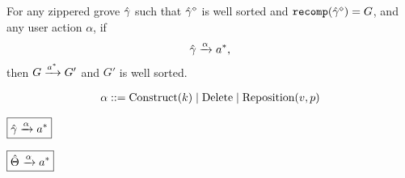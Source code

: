 \begin{theorem}[Sensibility]
  For any zippered grove $\Z{\Grove}$
  such that $\erase{\Z{\Grove}}$ is well sorted
    and $\recomp{\erase{\Z{\Grove}}} = G$,
  and any user action $\alpha$,
  if
  \[
    \applyAction{\Z{\Grove}}{\alpha}{a^{*}},
  \]
  then $G \action{a^{*}} G'$ and $G'$ is well sorted.
\end{theorem}

\[
  \arraycolsep=0pt
  \begin{array}{llll}
    \alpha & {}::={} &
      \Construct{k}
      \mid \Delete
      \mid \Reposition{v}{p}
    \\
  \end{array}
\]

\noindent $\boxed{\Z{\Grove} \action{\alpha} a^{*}}$
%
\begin{mathpar}


\end{mathpar}

\noindent $\boxed{\Z{\Set} \action{\alpha} a^{*}}$
%
\begin{mathpar}
\end{mathpar}

